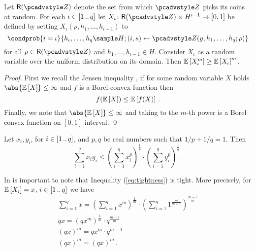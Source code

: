 \documentclass[runningheads,11pt]{llncs}
\begin{document}
\begin{lemma}\label{lem:jensen}
	Let $\RND{\zdv}$ denote the set from which $\zdv$ picks its coins at random.
	For each $\iota \in [1 \, .. \, q]$ let $X_\iota \colon \RND{\zdv} \times
	H^{\iota - 1} \to [0, 1]$ be defined by setting $X_\iota(\rho, h_1, \ldots,
h_{\iota - 1})$ to 
\[
  \condprob{i = \iota}{h_\iota, \ldots, h_q \sample H; (i, s) \gets \zdv(y, h_1,
    \ldots, h_q; \rho)}
	\] 
	for all $\rho \in \RND{\zdv}$ and $h_1, \ldots, h_{\iota - 1} \in H$. Consider
  $X_\iota$ as a random variable over the uniform distribution on its domain.
  Then $\mathbb{E}\left[X_\iota^m\right] \geq \mathbb{E}\left[X_\iota\right]^m$.
\end{lemma}
\begin{proof}
	First we recall the Jensen inequality \cite{W:Weissten20}, if for some random
  variable $X$ holds $\abs{\expected{X}} \leq \infty$ and $f$ is a Borel convex
  function then
	\[
		f(\mathbb{E}\left[X\right]) \leq \mathbb{E}\left[f(X)\right]\,.
	\] 
	Finally, we note that $\abs{\expected{X}} \leq \infty$ and taking to the
  $m$-th power is a Borel convex function on $[0, 1]$ interval. \qed
\end{proof}

\begin{lemma}\label{lem:holder}
	Let $x_i, y_i$, for $i \in [1 \, .. \, q]$, and $p, q$ be real numbers such that
  $1/p + 1/q = 1$. Then
	\begin{equation}
    \label{eq:tightness}
		\sum_{i = 1}^{q} x_i y_i \leq \left(\sum_{i = 1}^{q}
      x_i^p\right)^{\frac{1}{p}} \cdot \left(\sum_{i = 1}^{q}
      y_i^p\right)^{\frac{1}{q}}\,.
	\end{equation}
\end{lemma}

\begin{remark}
	In is important to note that Inequality (\ref{eq:tightness}) is tight. More
  precisely, for $\mathbb{E}\left[X_i\right] = x$, $i \in [1 \, .. \, q]$ we have
	\begin{gather*}
		\sum_{i = 1}^q x = \left(\sum_{i = 1}^{q} x^m\right)^\frac{1}{m} \cdot \left(\sum_{i = 1}^{q} 1^{\frac{m}{m - 1}}\right)^{\frac{m - 1}{m}} \\
		qx = \left(qx^m\right)^\frac{1}{m} \cdot q^{\frac{m - 1}{m}} \\
		(qx)^m = qx^m \cdot q^{m - 1} \\
		(qx)^m = (qx)^m\,.
	\end{gather*}
\end{remark}
\end{document}
